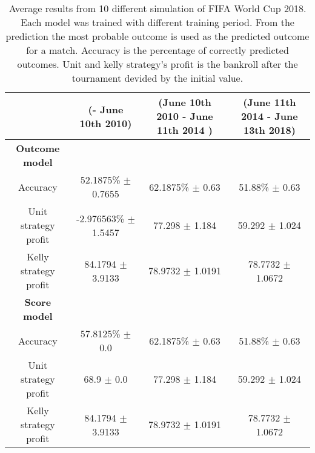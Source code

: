 \begin{sidewaystable}
    \caption{Average results from 10 different simulation of FIFA World Cup 2018. Each model was trained with different training period. From the prediction the most probable outcome is used as the predicted outcome for a match. Accuracy is the percentage of correctly predicted outcomes. Unit and kelly strategy's profit is the bankroll after the tournament devided by the initial value.}
    \begin{tabular}{ | c |c| c | c |}
    \hline
    & (- June 10th 2010) & (June 10th 2010 - June 11th 2014 ) & (June 11th 2014 - June 13th 2018) \\
    \hline
    \textbf{Outcome model} \\
    \hline
    Accuracy & 52.1875\% $\pm$ 0.7655 & 62.1875\% $\pm$ 0.63 & 51.88\% $\pm$ 0.63 \\
    Unit strategy profit& -2.976563\% $\pm$ 1.5457 & 77.298 $\pm$ 1.184 & 59.292 $\pm$ 1.024 \\
    Kelly strategy profit& 84.1794 $\pm$ 3.9133 & 78.9732 $\pm$ 1.0191 & 78.7732 $\pm$ 1.0672 \\
    \hline
    \textbf{Score model} \\
    \hline
    Accuracy & 57.8125\% $\pm$ 0.0 & 62.1875\% $\pm$ 0.63 & 51.88\% $\pm$ 0.63 \\
    Unit strategy profit& 68.9 $\pm$ 0.0 & 77.298 $\pm$ 1.184 & 59.292 $\pm$ 1.024 \\
    Kelly strategy profit& 84.1794 $\pm$ 3.9133 & 78.9732 $\pm$ 1.0191 & 78.7732 $\pm$ 1.0672 \\
    \hline
   \end{tabular}
\end{sidewaystable}

